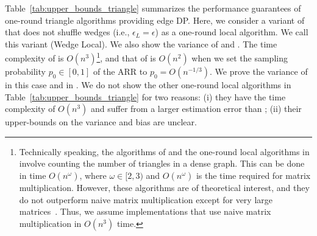 Table~\ref{tab:upper_bounds_triangle} summarizes the
performance guarantees
of one-round triangle algorithms providing edge DP.
Here,
we consider a variant of \AlgWSTri{} that does not shuffle wedges (i.e., $\epsilon_L = \epsilon$) as a one-round local algorithm.
We call this variant \AlgWLTri{} (Wedge Local).
We also show the variance of \AlgARRTri{} \cite{Imola_USENIX22} and \AlgRRTri{} \cite{Imola_USENIX21}.
The time complexity of \AlgRRTri{} is $O(n^3)$\footnote{Technically speaking, the algorithms of \AlgRRTri{} and
the one-round local algorithms in \cite{Ye_ICDE20,Ye_TKDE21} involve counting the number of triangles in a dense
graph. This can be done in time $O(n^\omega)$, where $\omega \in [2,3)$ and $O(n^\omega)$ is the time required for matrix multiplication. However, these algorithms are of theoretical interest,
and they do not outperform naive matrix multiplication except
for very large matrices~\cite{Alman_2021}. Thus, we assume implementations that use naive matrix multiplication in
$O(n^3)$ time.}, and that
of \AlgARRTri{} is $O(n^2)$ when we set the sampling probability $p_0 \in [0,1]$ of the ARR to $p_0=O(n^{-1/3})$.
We prove the variance of \AlgARRTri{} in this case and \AlgRRTri{}
in .
We do not show the other one-round local algorithms \cite{Ye_ICDE20,Ye_TKDE21} in Table~\ref{tab:upper_bounds_triangle} for two reasons: (i) they have the time complexity of $O(n^3)$ and suffer from a larger estimation error than \AlgRRTri{} \cite{Imola_USENIX22};
(ii) their upper-bounds on the variance and bias are unclear.

